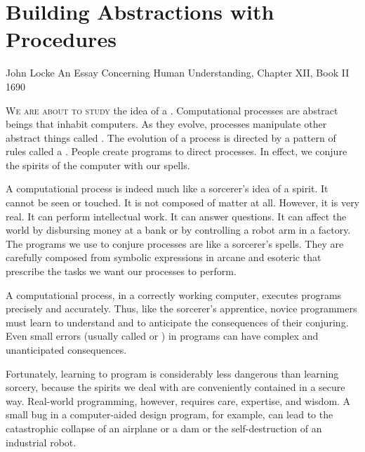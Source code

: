 \chapter{Building Abstractions with Procedures}
\label{Chapter 1}

  {John Locke}
  {An Essay Concerning Human Understanding, Chapter XII, Book II}
  {1690}

\noindent
\lettrine{W}{e are about to study} the idea of a .
Computational processes are abstract beings that inhabit computers. As they
evolve, processes manipulate other abstract things called . The
evolution of a process is directed by a pattern of rules called a
. People create programs to direct processes. In effect, we
conjure the spirits of the computer with our spells.

A computational process is indeed much like a sorcerer's idea of a spirit. It
cannot be seen or touched. It is not composed of matter at all. However, it
is very real. It can perform intellectual work. It can answer questions. It
can affect the world by disbursing money at a bank or by controlling a robot
arm in a factory. The programs we use to conjure processes are like a
sorcerer's spells. They are carefully composed from symbolic expressions in
arcane and esoteric  that prescribe the tasks we
want our processes to perform.

A computational process, in a correctly working computer, executes programs
precisely and accurately. Thus, like the sorcerer's apprentice, novice
programmers must learn to understand and to anticipate the consequences of
their conjuring. Even small errors (usually called  or
) in programs can have complex and unanticipated
consequences.

Fortunately, learning to program is considerably less dangerous than learning
sorcery, because the spirits we deal with are conveniently contained in a
secure way. Real-world programming, however, requires care, expertise, and
wisdom. A small bug in a computer-aided design program, for example, can lead
to the catastrophic collapse of an airplane or a dam or the self-destruction of
an industrial robot.

